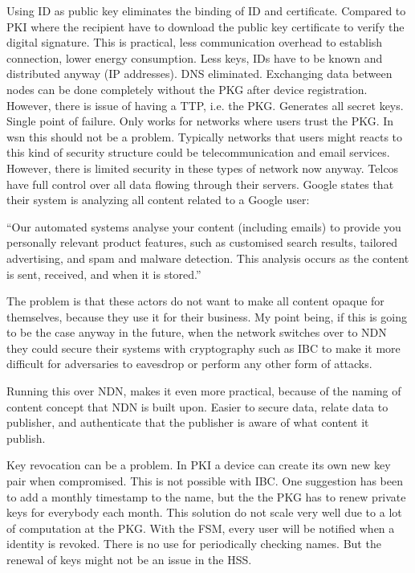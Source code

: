 Using \gls{ID} as public key eliminates the binding of ID and certificate. 
Compared to \gls{PKI} where the recipient have to download the public key certificate to verify the digital signature.
This is practical, less communication overhead to establish connection, lower energy consumption.
Less keys, IDs have to be known and distributed anyway (IP addresses).
DNS eliminated.
Exchanging data between nodes can be done completely without the \gls{PKG} after device registration.
However, there is issue of having a \gls{TTP}, i.e. the \gls{PKG}.
Generates all secret keys.
Single point of failure.
Only works for networks where users trust the \gls{PKG}. 
In \gls{wsn} this should not be a problem.
Typically networks that users might reacts to this kind of security structure could be telecommunication and email services. 
However, there is limited security in these types of network now anyway. 
Telcos have full control over all data flowing through their servers. 
Google states that their system is analyzing all content related to a Google user:
\begin{displayquote}
``Our automated systems analyse your content (including emails) to provide you personally relevant product features, such as customised search results, tailored advertising, and spam and malware detection. This analysis occurs as the content is sent, received, and when it is stored.''
~\cite{google_reads_email}
\end{displayquote}
The problem is that these actors do not want to make all content opaque for themselves, because they use it for their business. 
My point being, if this is going to be the case anyway in the future, when the network switches over to \gls{NDN} they could secure their systems with cryptography such as \gls{IBC} to make it more difficult for adversaries to eavesdrop or perform any other form of attacks.

Running this over \gls{NDN}, makes it even more practical, because of the naming of content concept that \gls{NDN} is built upon. 
Easier to secure data, relate data to publisher, and authenticate that the publisher is aware of what content it publish. 

Key revocation can be a problem.
In \gls{PKI} a device can create its own new key pair when compromised. 
This is not possible with \gls{IBC}.
One suggestion has been to add a monthly timestamp to the \gls{name}, but the the \gls{PKG} has to renew private keys for everybody each month. 
This solution do not scale very well due to a lot of computation at the \gls{PKG}.
With the \gls{FSM}, every user will be notified when a identity is revoked.
There is no use for periodically checking names.
But the renewal of keys might not be an issue in the \gls{HSS}. 

